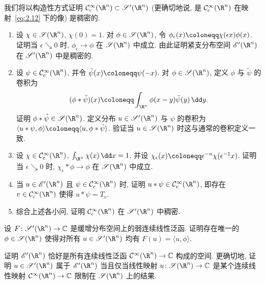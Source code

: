 \begin{exer}\label{ex:2.2}
我们将以构造性方式证明 $\SmoothComp(\R^n) \subset \TempDistr(\R^n)$ (更确切地说, 是 $\SmoothComp(\R^n)$ 在映射~\eqref{eq:2.12} 下的像) 是稠密的.
\begin{enumerate}
    \item 设 $\chi \in \Schwartz(\R^n)$, $\chi(0) = 1$. 对 $\phi \in \Schwartz(\R^n)$, 令 $\phi_\epsilon(x) \defeq \chi(\epsilon x) \phi(x)$. 证明当 $\epsilon \searrow 0$ 时, $\phi_\epsilon \to \phi$ 在 $\Schwartz(\R^n)$ 中成立. 由此证明紧支分布空间 $\mathscr{E}'(\R^n)$ 在 $\TempDistr(\R^n)$ 中是稠密的.
    \item 设 $\psi \in \SmoothComp(\R^n)$, 并令 $\tilde{\psi}(x) \defeq \psi(-x)$. 对 $\phi \in \Schwartz(\R^n)$, 定义 $\phi$ 与 $\tilde{\psi}$ 的卷积为
    \begin{equation}\label{eq:2.68}
        (\phi * \tilde{\psi})(x) \defeq \int_{\R^n} \phi(x - y) \tilde{\psi}(y) \,\dd y.
    \end{equation}
    证明 $\phi * \tilde{\psi} \in \Schwartz(\R^n)$. 定义分布 $u \in \TempDistr(\R^n)$ 与 $\psi$ 的卷积为 $\langle u * \psi, \phi \rangle \defeq \langle u, \phi * \tilde{\psi} \rangle$. 验证当 $u \in \Schwartz(\R^n)$ 时这与通常的卷积定义一致.
    \item 设 $\chi \in \SmoothComp(\R^n)$, $\int_{\R^n} \chi(x) \,\dd x = 1$, 并设 $\chi_\epsilon(x) \defeq \epsilon^{-n} \chi(\epsilon^{-1} x)$. 证明当 $\epsilon \searrow 0$ 时, $\chi_\epsilon * \phi \to \phi$ 在 $\Schwartz(\R^n)$ 中成立.
    \item 当 $u \in \mathscr{E}'(\R^n)$ 且 $\psi \in \SmoothComp(\R^n)$ 时, 证明 $u * \psi \in \SmoothComp(\R^n)$, 即存在 $v \in \SmoothComp(\R^n)$ 使得 $u * \psi = T_v$.
    \item 综合上述各小问, 证明 $\SmoothComp(\R^n)$ 在 $\TempDistr(\R^n)$ 中稠密.
\end{enumerate}
\end{exer}

\begin{exer}[缓增分布空间的对偶空间]\label{ex:2.3}
设 $F \colon \TempDistr(\R^n) \to \mathbb{C}$ 是缓增分布空间上的弱连续线性泛函. 证明存在唯一的 $\phi \in \Schwartz(\R^n)$ 使得对所有 $u \in \TempDistr(\R^n)$ 均有 $F(u) = \langle u, \phi \rangle$.
\end{exer}

\begin{exer}[紧支分布空间]\label{ex:2.4}
证明 $\mathscr{E}'(\R^n)$ 恰好是所有连续线性泛函 $\Smooth(\R^n) \to \mathbb{C}$ 构成的空间. 更确切地, 证明 $u \in \TempDistr(\R^n)$ 属于 $\mathscr{E}'(\R^n)$ 当且仅当线性映射 $u \colon \Schwartz(\R^n) \to \mathbb{C}$ 是某个连续线性映射 $\Smooth(\R^n) \to \mathbb{C}$ 限制在 $\Schwartz(\R^n)$ 上的结果.
\end{exer}

